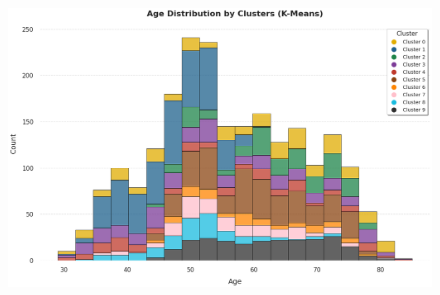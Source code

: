\documentclass[11pt]{article}
\begin{document}
\begin{figure}[H]
\centering
\includegraphics[width=13.61cm,height=8.98cm]{./images/image22.png}
\end{figure}
\end{document}
